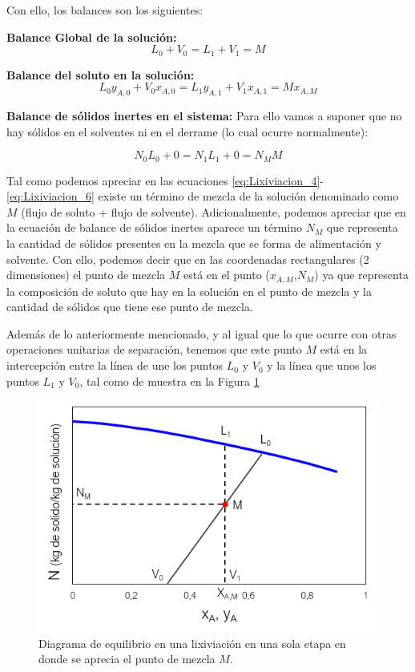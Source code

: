 \documentclass[11pt]{book}
\begin{document}
Con ello, los balances son los siguientes:

\textbf{Balance Global de la solución:}
\begin{equation}
    \label{eq:Lixiviacion_4}
    L_0 + V_0 = L_1 + V_1 = M
\end{equation}

\textbf{Balance del soluto en la solución:}
\begin{equation}
    \label{eq:Lixiviacion_5}
    L_0 y_{A,0} + V_0 x_{A,0} = L_1 y_{A,1} + V_1 x_{A,1} = M x_{A,M}
\end{equation}

\textbf{Balance de sólidos inertes en el sistema:}
Para ello vamos a suponer que no hay sólidos en el solventes ni en el derrame (lo cual ocurre normalmente):

\begin{equation}
    \label{eq:Lixiviacion_6}
    N_0 L_0 + 0 = N_1 L_1 + 0 = N_{M} M
\end{equation}

Tal como podemos apreciar en las ecuaciones \ref{eq:Lixiviacion_4}-\ref{eq:Lixiviacion_6} existe un término de mezcla de la solución denominado como $M$ (flujo de soluto + flujo de solvente). Adicionalmente, podemos apreciar que en la ecuación de balance de sólidos inertes aparece un término $N_M$ que representa la cantidad de sólidos presentes en la mezcla que se forma de alimentación y solvente. Con ello, podemos decir que en las coordenadas rectangulares (2 dimensiones) el punto de mezcla $M$ está en el punto ($x_{A,M}$,$N_M$) ya que representa la composición de soluto que hay en la solución en el punto de mezcla y la cantidad de sólidos que tiene ese punto de mezcla.

Además de lo anteriormente mencionado, y al igual que lo que ocurre con otras operaciones unitarias de separación, tenemos que este punto $M$ está en la intercepción entre la línea de une los puntos $L_0$ y $V_0$ y la línea que unos los puntos $L_1$ y $V_0$, tal como de muestra en la Figura \ref{fig:Lixiviacion_4}

\begin{figure}[H]
    \centering
    \includegraphics{img/lixiviacion/EquilibrioLixiviacion_4.PNG}
    \caption{Diagrama de equilibrio en una lixiviación en una sola etapa en donde se aprecia el punto de mezcla $M$.}
    \label{fig:Lixiviacion_4}
\end{figure}
\end{document}
